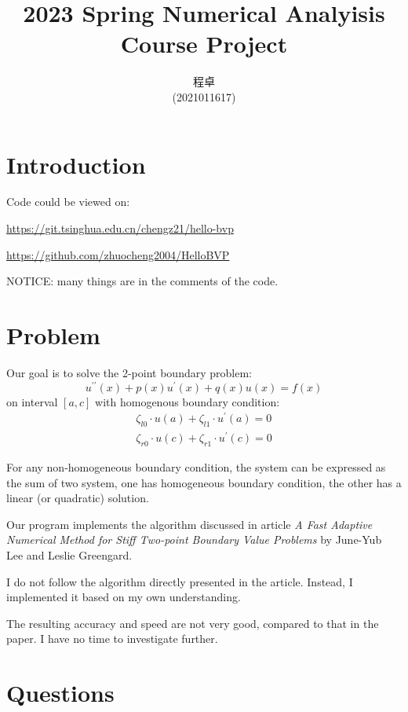 \documentclass{article}
\title{
    {2023 Spring Numerical Analyisis Course Project}
}
\author{\begin{Chinese}程卓\end{Chinese} (2021011617)}
\begin{document}
\maketitle

\tableofcontents

\section{Introduction}
Code could be viewed on:

\url{https://git.tsinghua.edu.cn/chengz21/hello-bvp}

\url{https://github.com/zhuocheng2004/HelloBVP}

NOTICE: many things are in the comments of the code.

\section{Problem}
Our goal is to solve the 2-point boundary problem:
$$
    u^{\prime\prime}(x) + p(x)u^\prime(x) + q(x)u(x) = f(x)
$$
on interval $[a, c]$
with homogenous boundary condition:
\begin{align}
    \zeta_{l0} \cdot u(a) + \zeta_{l1} \cdot u^\prime(a) = 0 \\
    \zeta_{r0} \cdot u(c) + \zeta_{r1} \cdot u^\prime(c) = 0
\end{align}


For any non-homogeneous boundary condition, 
the system can be expressed as the sum of two system, 
one has homogeneous boundary condition, 
the other has a linear (or quadratic) solution.

Our program implements the algorithm discussed in article 
{\sl A Fast Adaptive Numerical Method for Stiff Two-point Boundary Value Problems}
by June-Yub Lee and Leslie Greengard.

I do not follow the algorithm directly presented in the article. 
Instead, I implemented it based on my own understanding.

The resulting accuracy and speed are not very good, compared to that in the paper.
I have no time to investigate further.

\section{Questions}
\subsection{}
\end{document}
